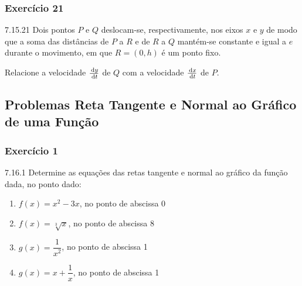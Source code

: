 \subsubsection*{Exercício 21}
\begin{exercicio}[21]{7.15.21}
Dois pontos $P$ e $Q$ deslocam-se, respectivamente, nos eixos $x$ e $y$ de modo que a soma das distâncias de $P$ a $R$ e de $R$ a $Q$ mantém-se constante e igual a $e$ durante o movimento, em que $R = (0, h)$ é um ponto fixo.

\begin{center}
\end{center}

Relacione a velocidade $\frac{\,\mathrm{d} y}{\,\mathrm{d} t}$ de $Q$ com a velocidade $\frac{\,\mathrm{d} x}{\,\mathrm{d} t}$ de $P$.
\end{exercicio}

\clearpage

\subsection{Problemas Reta Tangente e Normal ao Gráfico de uma Função}

\subsubsection*{Exercício 1}
\begin{exercicio}[1]{7.16.1}
Determine as equações das retas tangente e normal ao gráfico da função dada, no ponto dado:
\begin{enumerate}[label=\alph*)]
    \item $f(x) = x^2 - 3x$, no ponto de abscissa 0
    \item $f(x) = \sqrt[3]{x}$, no ponto de abscissa 8
    \item $g(x) = \dfrac{1}{x^2}$, no ponto de abscissa 1
    \item $g(x) = x + \dfrac{1}{x}$, no ponto de abscissa 1
\end{enumerate}
\end{exercicio}

